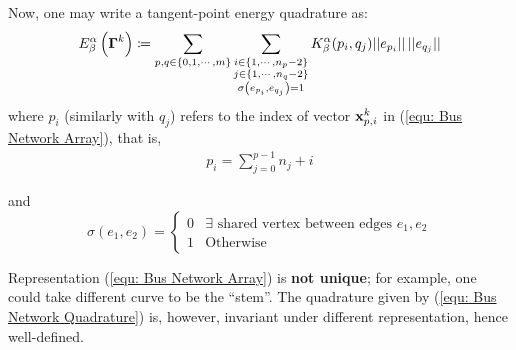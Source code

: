 \documentclass[../dissertation.tex]{subfiles}
\begin{document}
Now, one may write a tangent-point energy quadrature as:
\begin{equation}
    E_{\beta}^{\alpha} \left( \boldsymbol{\Gamma}^k \right) \coloneqq 
    \sum_{p, q \in \left\{ 0, 1, \cdots, m \right\}}
    \sum_{\substack{
            i \in \left\{ 1, \cdots, n_p - 2 \right\} \\
            j \in \left\{ 1, \cdots, n_q - 2 \right\} \\
            \sigma \left( e_{p_i}, e_{q_j} \right) = 1
    }}
    K_{\beta}^{\alpha} (p_i,q_j) \lvert \lvert e_{p_i} \rvert \rvert \, \lvert \lvert e_{q_j} \rvert \rvert
    \label{equ: Bus Network Quadrature}
\end{equation}
where $p_i$ (similarly with $q_j$) refers to the index of vector $\mathbf{x}_{p,i}^k$ in (\ref{equ: Bus Network Array}),
that is,
\begin{align*}
    p_i = \sum_{j=0}^{p-1} n_j + i
\end{align*}

and
\begin{equation*}
    \sigma \left( e_1, e_2 \right) =
    \begin{cases}
        0 & \exists \text{ shared vertex between edges } e_1, e_2 \\
        1 & \text{Otherwise}
    \end{cases}
\end{equation*}

\begin{remark}
    Representation (\ref{equ: Bus Network Array}) is \textbf{not unique}; for example, one could take different curve to be the ``stem''.
    The quadrature given by (\ref{equ: Bus Network Quadrature}) is, however, invariant under different representation, hence well-defined.
\end{remark}


%
\end{document}

